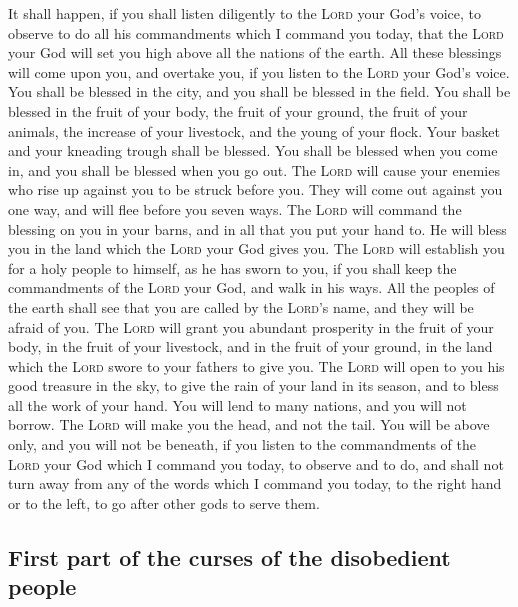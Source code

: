  It shall happen, if you shall listen diligently to the
\textsc{Lord} your God's voice, to observe to do all his commandments
which I command you today, that the \textsc{Lord} your God will set you
high above all the nations of the earth.  All these
blessings will come upon you, and overtake you, if you listen to the
\textsc{Lord} your God's voice.  You shall be blessed in
the city, and you shall be blessed in the field.  You
shall be blessed in the fruit of your body, the fruit of your ground,
the fruit of your animals, the increase of your livestock, and the young
of your flock.  Your basket and your kneading trough shall
be blessed.  You shall be blessed when you come in, and
you shall be blessed when you go out.  The \textsc{Lord}
will cause your enemies who rise up against you to be struck before you.
They will come out against you one way, and will flee before you seven
ways.  The \textsc{Lord} will command the blessing on you
in your barns, and in all that you put your hand to. He will bless you
in the land which the \textsc{Lord} your God gives you. 
The \textsc{Lord} will establish you for a holy people to himself, as he
has sworn to you, if you shall keep the commandments of the
\textsc{Lord} your God, and walk in his ways.  All the
peoples of the earth shall see that you are called by the
\textsc{Lord}'s name, and they will be afraid of you. 
The \textsc{Lord} will grant you abundant prosperity in the fruit of
your body, in the fruit of your livestock, and in the fruit of your
ground, in the land which the \textsc{Lord} swore to your fathers to
give you.  The \textsc{Lord} will open to you his good
treasure in the sky, to give the rain of your land in its season, and to
bless all the work of your hand. You will lend to many nations, and you
will not borrow.  The \textsc{Lord} will make you the
head, and not the tail. You will be above only, and you will not be
beneath, if you listen to the commandments of the \textsc{Lord} your God
which I command you today, to observe and to do,  and
shall not turn away from any of the words which I command you today, to
the right hand or to the left, to go after other gods to serve them.

\hypertarget{first-part-of-the-curses-of-the-disobedient-people}{%
\subsection{First part of the curses of the disobedient
people}\label{first-part-of-the-curses-of-the-disobedient-people}}

